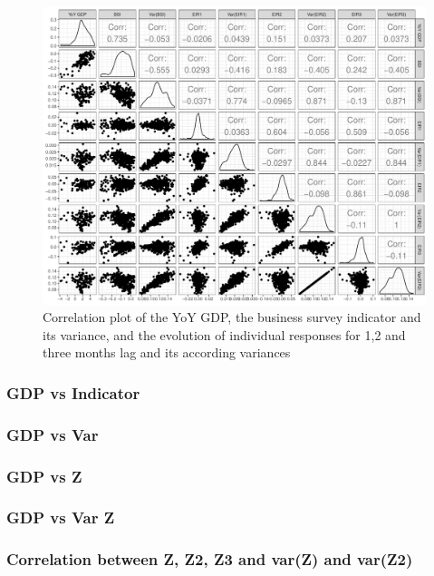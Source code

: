 \documentclass[12pt,a4paper,oneside]{book}
\begin{document}
\begin{figure}[H]
    \centering
    \includegraphics[scale=0.5]{Graphs/corr_indicators.pdf}
    \caption{Correlation plot of the YoY GDP, the business survey indicator and its variance, and the evolution of individual responses for 1,2 and three months lag and its according variances}
    \label{fig:corr indicators}
\end{figure}

\subsubsection{GDP vs Indicator}

\subsubsection{GDP vs Var}

\subsubsection{GDP vs Z}

\subsubsection{GDP vs Var Z}

\subsubsection{Correlation between Z, Z2, Z3 and var(Z) and var(Z2)}
\end{document}

